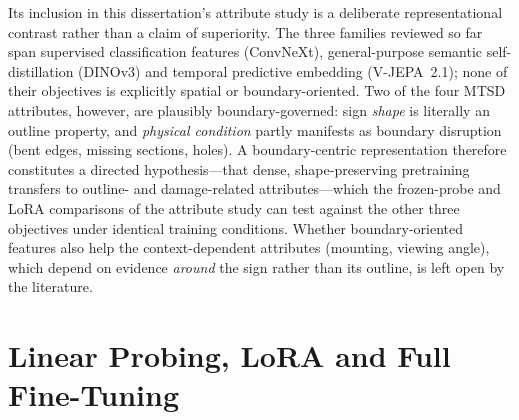 Its inclusion in this dissertation's attribute study is a deliberate representational contrast rather than a claim of superiority. The three families reviewed so far span supervised classification features (ConvNeXt), general-purpose semantic self-distillation (DINOv3) and temporal predictive embedding (V-JEPA~2.1); none of their objectives is explicitly spatial or boundary-oriented. Two of the four MTSD attributes, however, are plausibly boundary-governed: sign \emph{shape} is literally an outline property, and \emph{physical condition} partly manifests as boundary disruption (bent edges, missing sections, holes). A boundary-centric representation therefore constitutes a directed hypothesis---that dense, shape-preserving pretraining transfers to outline- and damage-related attributes---which the frozen-probe and LoRA comparisons of the attribute study can test against the other three objectives under identical training conditions. Whether boundary-oriented features also help the context-dependent attributes (mounting, viewing angle), which depend on evidence \emph{around} the sign rather than its outline, is left open by the literature.

\section{Linear Probing, LoRA and Full Fine-Tuning}
\label{sec:lr-adaptation}

